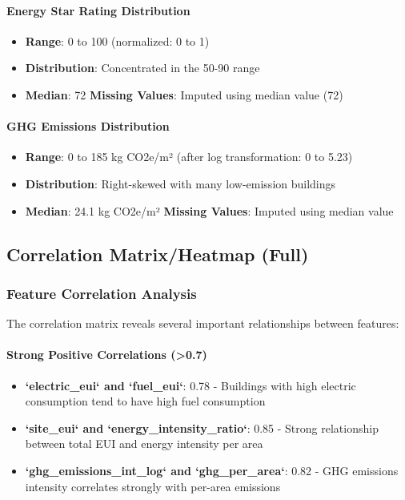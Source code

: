 \paragraph{Energy Star Rating Distribution}
\begin{itemize}
    \item \textbf{Range}: 0 to 100 (normalized: 0 to 1)
    \item \textbf{Distribution}: Concentrated in the 50-90 range
    \item \textbf{Median}: 72
    \textbf{Missing Values}: Imputed using median value (72)
\end{itemize}

\paragraph{GHG Emissions Distribution}
\begin{itemize}
    \item \textbf{Range}: 0 to 185 kg CO2e/m² (after log transformation: 0 to 5.23)
    \item \textbf{Distribution}: Right-skewed with many low-emission buildings
    \item \textbf{Median}: 24.1 kg CO2e/m²
    \textbf{Missing Values}: Imputed using median value
\end{itemize}

\subsection{Correlation Matrix/Heatmap (Full)}

\subsubsection{Feature Correlation Analysis}

The correlation matrix reveals several important relationships between features:

\paragraph{Strong Positive Correlations (>0.7)}
\begin{itemize}
    \item \textbf{`electric\_eui` and `fuel\_eui`}: 0.78 - Buildings with high electric consumption tend to have high fuel consumption
    \item \textbf{`site\_eui` and `energy\_intensity\_ratio`}: 0.85 - Strong relationship between total EUI and energy intensity per area
    \item \textbf{`ghg\_emissions\_int\_log` and `ghg\_per\_area`}: 0.82 - GHG emissions intensity correlates strongly with per-area emissions
\end{itemize}

